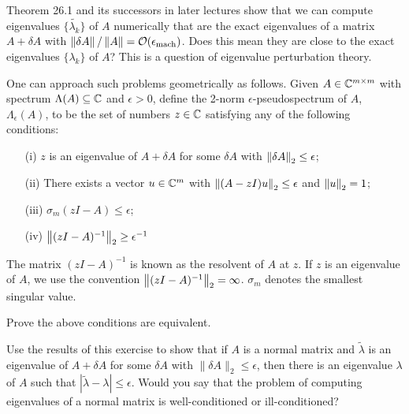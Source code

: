 \documentclass[10pt]{article}
\begin{document}
\maketitle

\begin{problem}[Exercise 26.1]
Theorem 26.1 and its successors in later lectures show that we can compute eigenvalues \( \{ \tilde{\lambda_k}\} \) of \( A \) numerically that are the exact eigenvalues of a matrix \( A+\delta A \) with \( \left\lVert\delta A\right\rVert/\left\lVert A\right\rVert = \mathcal{O}(\epsilon_{\text{mach}}) \). Does this mean they are close to the exact eigenvalues \( \{ \lambda_k \} \) of \( A \)? This is a question of eigenvalue perturbation theory.

    One can approach such problems geometrically as follows. Given \( A\in\mathbb{C}^{m\times m} \) with spectrum \( \Lambda(A) \subseteq \mathbb{C} \) and \( \epsilon > 0 \), define the 2-norm \( \epsilon \)-pseudospectrum of \( A \),  \( \Lambda_{\epsilon}(A) \), to be the set of numbers \( z\in\mathbb{C} \) satisfying any of the following conditions:
    \begin{enumerate}[nolistsep]
        \item[(i)] \( z \) is an eigenvalue of \( A+\delta A \) for some \( \delta A \) with \( \left\lVert\delta A\right\rVert_2\leq \epsilon \);
        \item[(ii)] There exists a vector \( u\in\mathbb{C}^{m} \) with \( \left\lVert(A-zI)u\right\rVert_2 \leq \epsilon \) and \( \left\lVert u\right\rVert_2=1 \);
        \item[(iii)] \( \sigma_m(zI-A) \leq \epsilon \);
        \item[(iv)] \( \left\lVert(zI-A)^{-1}\right\rVert_2 \geq \epsilon^{-1} \)
    \end{enumerate}
    
    The matrix \( (zI-A)^{-1} \) is known as the resolvent of \( A \) at \( z \). If \( z \) is an eigenvalue of \( A \), we use the convention \( \left\lVert(zI-A)^{-1}\right\rVert_2 = \infty \). \( \sigma_m \) denotes the smallest singular value.

    Prove the above conditions are equivalent.

    Use the results of this exercise to show that if \(A\) is a normal matrix and \(\tilde{\lambda}\) is an eigenvalue of \(A+ \delta A\) for some \(\delta A\) with \(\| \delta A \|_2 \leq \epsilon\), then there is an eigenvalue \(\lambda\) of \(A\) such that \(| \tilde{\lambda} - \lambda | \leq \epsilon\).  Would you say that the problem of computing eigenvalues of a normal matrix is well-conditioned or ill-conditioned?
\end{problem}
\end{document}
